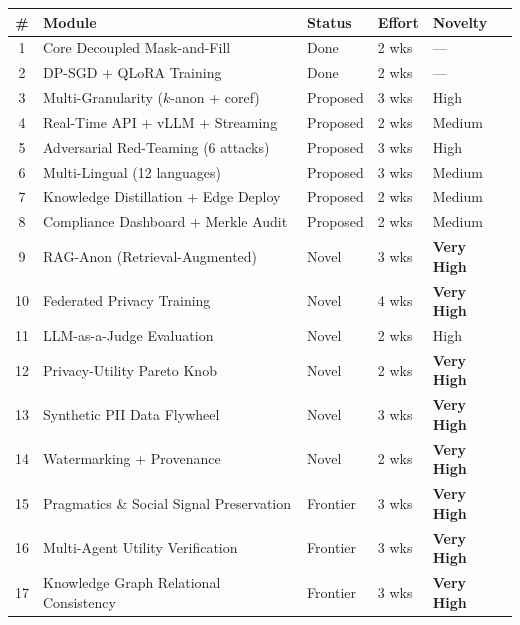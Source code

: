 \documentclass[11pt, a4paper]{article}
\begin{document}
\begin{table}[H]
\centering
\small
\begin{tabular}{cllll}
\toprule
\textbf{\#} & \textbf{Module} & \textbf{Status} & \textbf{Effort} & \textbf{Novelty} \\
\midrule
1 & Core Decoupled Mask-and-Fill & \textcolor{green!70!black}{Done} & 2 wks & --- \\
2 & DP-SGD + QLoRA Training & \textcolor{green!70!black}{Done} & 2 wks & --- \\
\midrule
3 & Multi-Granularity ($k$-anon + coref) & \textcolor{orange!70!black}{Proposed} & 3 wks & High \\
4 & Real-Time API + vLLM + Streaming & \textcolor{orange!70!black}{Proposed} & 2 wks & Medium \\
5 & Adversarial Red-Teaming (6 attacks) & \textcolor{orange!70!black}{Proposed} & 3 wks & High \\
6 & Multi-Lingual (12 languages) & \textcolor{orange!70!black}{Proposed} & 3 wks & Medium \\
7 & Knowledge Distillation + Edge Deploy & \textcolor{orange!70!black}{Proposed} & 2 wks & Medium \\
8 & Compliance Dashboard + Merkle Audit & \textcolor{orange!70!black}{Proposed} & 2 wks & Medium \\
\midrule
9 & RAG-Anon (Retrieval-Augmented) & \textcolor{red!70!black}{Novel} & 3 wks & \textbf{Very High} \\
10 & Federated Privacy Training & \textcolor{red!70!black}{Novel} & 4 wks & \textbf{Very High} \\
11 & LLM-as-a-Judge Evaluation & \textcolor{red!70!black}{Novel} & 2 wks & High \\
12 & Privacy-Utility Pareto Knob & \textcolor{red!70!black}{Novel} & 2 wks & \textbf{Very High} \\
13 & Synthetic PII Data Flywheel & \textcolor{red!70!black}{Novel} & 3 wks & \textbf{Very High} \\
14 & Watermarking + Provenance & \textcolor{red!70!black}{Novel} & 2 wks & \textbf{Very High} \\
\midrule
\rowcolor{cyan!8}
15 & Pragmatics \& Social Signal Preservation & \textcolor{blue!70!black}{Frontier} & 3 wks & \textbf{Very High} \\
\rowcolor{cyan!8}
16 & Multi-Agent Utility Verification & \textcolor{blue!70!black}{Frontier} & 3 wks & \textbf{Very High} \\
\rowcolor{cyan!8}
17 & Knowledge Graph Relational Consistency & \textcolor{blue!70!black}{Frontier} & 3 wks & \textbf{Very High} \\

\end{tabular}
\end{table}
\end{document}
